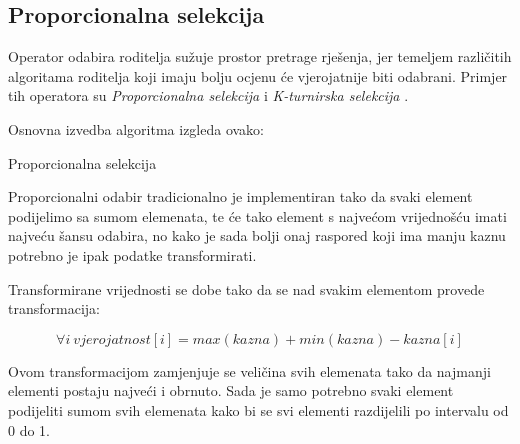 \documentclass[times, utf8, zavrsni]{fer}
\begin{document}
\subsection{Proporcionalna selekcija}

Operator odabira roditelja sužuje prostor pretrage rješenja, jer temeljem različitih algoritama roditelja koji imaju bolju ocjenu će vjerojatnije biti odabrani. Primjer tih operatora su \emph{Proporcionalna selekcija}  i \emph{K-turnirska selekcija} .

Osnovna izvedba algoritma izgleda ovako:
\begin{algorithm}
\caption{Proporcionalna selekcija}
\label{algo:proporcionalno}
\begin{algorithmic}
\STATE{}
\ENDFOR
{}
\ENDFOR
\STATE{}
\ENDIF
\ENDFOR
\end{algorithmic}
\end{algorithm}

Proporcionalni odabir tradicionalno je implementiran tako da svaki element podijelimo sa sumom elemenata, te će tako element s najvećom vrijednošću imati najveću šansu odabira, no kako je sada bolji onaj raspored koji ima manju kaznu potrebno je ipak podatke transformirati.

Transformirane vrijednosti se dobe tako da se nad svakim elementom provede transformacija:

\begin{equation}
\forall i\ vjerojatnost[i] = max(kazna) + min(kazna) - kazna[i]
\label{eq:trans-kazne}
\end{equation}

Ovom transformacijom zamjenjuje se veličina svih elemenata tako da najmanji elementi postaju najveći i obrnuto. Sada je samo potrebno svaki element podijeliti sumom svih elemenata kako bi se svi elementi razdijelili po intervalu od 0 do 1.
\end{document}
